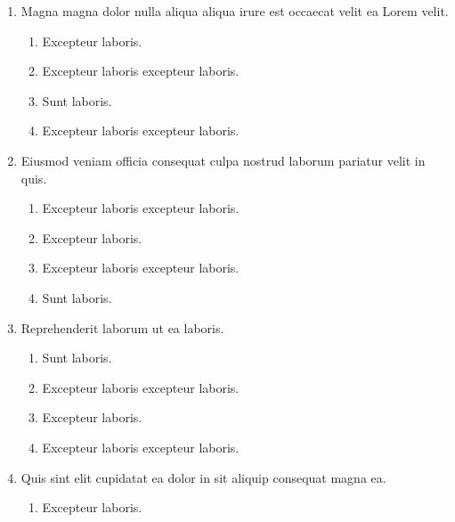 \documentclass[a4paper,12pt]{article}
\begin{document}
\begin{enumerate}[label=\textbf{\arabic*.}]
\begin{multicols}{2}
\end{multicols}
\item Magna magna dolor nulla aliqua aliqua irure est occaecat velit ea Lorem velit.
\begin{multicols}{2}
	\begin{enumerate}
		\item  Excepteur laboris.
    
		\item  Excepteur laboris excepteur laboris.
    
		\item  Sunt laboris.
    
		\item  Excepteur laboris excepteur laboris.
  
	\end{enumerate}

\end{multicols}
\item Eiusmod veniam officia consequat culpa nostrud laborum pariatur velit in quis.
\begin{multicols}{2}
	\begin{enumerate}
		\item  Excepteur laboris excepteur laboris.
  
		\item  Excepteur laboris.
    
		\item  Excepteur laboris excepteur laboris.
    
		\item  Sunt laboris.
    
	\end{enumerate}

\end{multicols}
\item Reprehenderit laborum ut ea laboris.
\begin{multicols}{2}
	\begin{enumerate}
		\item  Sunt laboris.
    
		\item  Excepteur laboris excepteur laboris.
  
		\item  Excepteur laboris.
    
		\item  Excepteur laboris excepteur laboris.
    
	\end{enumerate}

\end{multicols}
\item Quis sint elit cupidatat ea dolor in sit aliquip consequat magna ea.
\begin{multicols}{2}
	\begin{enumerate}
		\item  Excepteur laboris.
    

\end{enumerate}
\end{multicols}
\end{enumerate}
\end{document}

